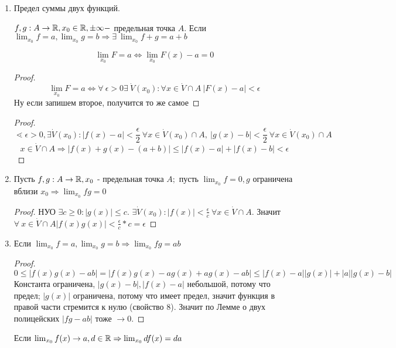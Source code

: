 \documentclass[12pt]{report}
\begin{document}
\begin{prop}
\begin{enumerate}
\item Предел суммы двух функций.

$f, g: A \to \mathbb{R}, x_0 \in \mathbb{R}, \pm \infty - $ предельная точка $A$. Если $\lim_{x_0}{f} = a, \lim_{x_0}{g} = b \Rightarrow \exists ~\lim_{x_0}{f + g} = a + b$

\begin{note}
$$\lim_{x_0}{F} = a \Leftrightarrow \lim_{x_0}{F(x) - a} = 0$$
\end{note}
\begin{proof}
$$\lim_{x_0}{F} = a \Leftrightarrow \forall ~\epsilon > 0 \exists ~\dot V(x_0): \forall x \in \dot V \cap A ~|F(x) - a| < \epsilon$$
Ну если запишем второе, получится то же самое
\end{proof}

\begin{proof}
$$\lessdot \epsilon > 0, \exists \dot V(x_0): |f(x) - a| < \frac{\epsilon}{2} ~\forall x \in \dot V(x_0) \cap A, ~|g(x) - b| < \frac{\epsilon}{2} ~\forall x \in \dot V(x_0) \cap A$$
$$x \in \dot V \cap A \Rightarrow |f(x) + g(x) - (a + b)| \le |f(x) - a| + |f(x) - b| < \epsilon$$
\end{proof}

\item 
Пусть $f, g: A \to \mathbb{R}, x_0$ - предельная точка $A;$ пусть $\lim_{x_0}{f} = 0, g$ ограничена вблизи $x_0 \Rightarrow \lim_{x_0}{fg} = 0$
\begin{proof}
НУО $\exists c \ge 0: |g(x)| \le c$. $\exists \dot V(x_0): |f(x)| < \frac{\epsilon}{c} ~\forall x \in \dot V \cap A$. Значит $\forall ~x \in \dot V \cap A |f(x)g(x)| < \frac{\epsilon}{c} * c = \epsilon$
\end{proof}

\item
\begin{cor}
Если $\lim_{x_0}{f} = a, \lim_{x_0}{g} = b \Rightarrow \lim_{x_0}{fg} = ab$
\end{cor}
\begin{proof}
$$0 \le |f(x)g(x) - ab| = |f(x)g(x) - ag(x) + ag(x) - ab| \le |f(x) - a||g(x)| + |a||g(x) - b|$$
Константа ограничена, $|g(x) - b|, |f(x) - a|$ небольшой, потому что предел; $|g(x)|$ ограничена, потому что имеет предел, значит функция в правой части стремится к нулю (свойство $8$). Значит по Лемме о двух полицейских $|fg - ab|$ тоже $\to 0$.
\end{proof}

\begin{note}
Если $\lim_{x_0}{f(x)} \to a, d \in \mathbb{R} \Rightarrow \lim_{x_0}{df(x)} = da$
\end{note}


\end{enumerate}
\end{prop}
\end{document}
